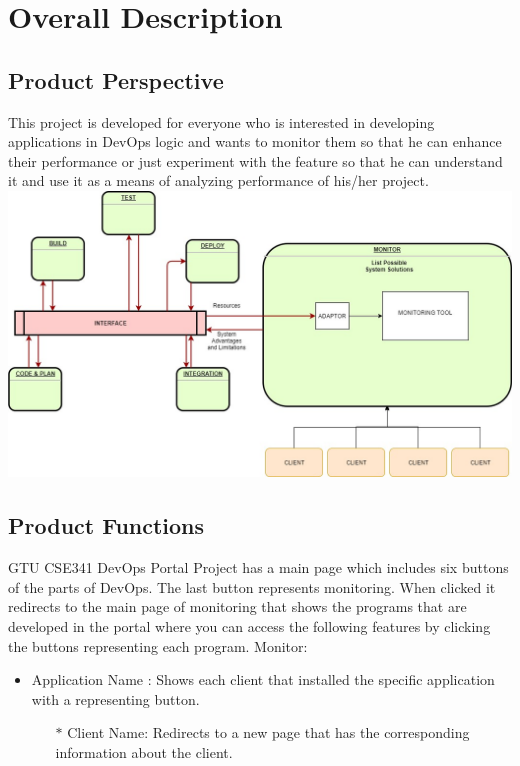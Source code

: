\documentclass{article}
\begin{document}
\section{Overall Description} 
	\subsection{ Product Perspective}
    This project  is developed for everyone who is interested in developing applications in DevOps logic and wants to monitor them so that he can enhance their performance or just experiment with the feature so that he can understand it and use it as a means of analyzing performance of his/her project.
\newline \newline
\includegraphics[width=15cm]{uml} %
\newline
	\subsection{Product Functions}
GTU CSE341 DevOps Portal Project has a main page which includes six buttons of the parts of DevOps. The last button represents  monitoring. When clicked it redirects to the main page of monitoring that shows the programs that are developed in the portal where you can access the following features by clicking the buttons representing each program. \newline \newline
\newline \newline Monitor: 
 \begin{itemize}
  	\item Application Name : Shows each client that installed the specific application with a representing button.
	 \begin{itemize}
      		\item[$\ast$]{Client Name: Redirects to a new page that has the corresponding information about the client.}	
    \end{itemize}
\end{itemize}
\end{document}
